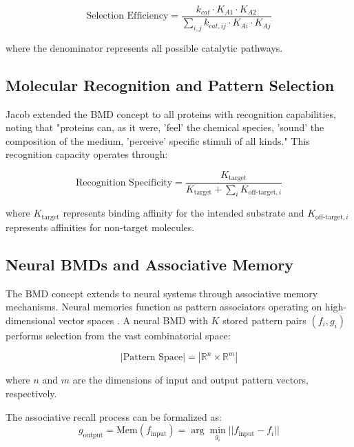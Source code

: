 \documentclass[12pt,a4paper]{article}
\begin{document}
\begin{equation}
\text{Selection Efficiency} = \frac{k_{cat} \cdot K_{A1} \cdot K_{A2}}{\sum_{i,j} k_{cat,ij} \cdot K_{Ai} \cdot K_{Aj}}
\end{equation}

where the denominator represents all possible catalytic pathways.

\subsection{Molecular Recognition and Pattern Selection}

Jacob \citep{jacob1973} extended the BMD concept to all proteins with recognition capabilities, noting that "proteins can, as it were, 'feel' the chemical species, 'sound' the composition of the medium, 'perceive' specific stimuli of all kinds." This recognition capacity operates through:

\begin{equation}
\text{Recognition Specificity} = \frac{K_{\text{target}}}{K_{\text{target}} + \sum_{i} K_{\text{off-target},i}}
\end{equation}

where $K_{\text{target}}$ represents binding affinity for the intended substrate and $K_{\text{off-target},i}$ represents affinities for non-target molecules.

\subsection{Neural BMDs and Associative Memory}

The BMD concept extends to neural systems through associative memory mechanisms. Neural memories function as pattern associators operating on high-dimensional vector spaces \citep{hopfield1982}. A neural BMD with $K$ stored pattern pairs $(f_i, g_i)$ performs selection from the vast combinatorial space:

\begin{equation}
|\text{Pattern Space}| = |\mathbb{R}^n \times \mathbb{R}^m|
\end{equation}

where $n$ and $m$ are the dimensions of input and output pattern vectors, respectively.

The associative recall process can be formalized as:
\begin{equation}
g_{\text{output}} = \text{Mem}(f_{\text{input}}) = \arg\min_{g_i} ||f_{\text{input}} - f_i||
\end{equation}
\end{document}
